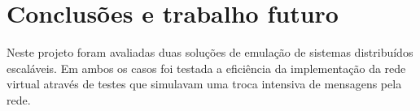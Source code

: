 
\section{Conclusões e trabalho futuro}








Neste projeto foram avaliadas duas soluções de emulação de sistemas distribuídos escaláveis. 
Em ambos os casos foi testada a eficiência da implementação da rede virtual através de testes 
que simulavam uma troca intensiva de mensagens pela rede. 

